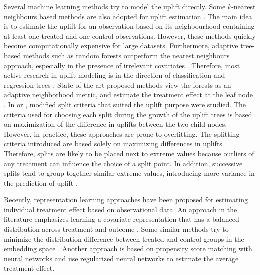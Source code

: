 \documentclass{article}
\begin{document}
Several machine learning methods try to model the uplift directly. Some $k$-nearest neighbours \citep{cover1967nearest} based methods are also adopted for uplift estimation \citep{crump2008nonparametric, Alemi.etal-PersonalizedMedicine-2009, su2012facilitating}. The main idea is to estimate the uplift for an observation based on its neighbourhood containing at least one treated and one control observations. However, these methods quickly become computationally expensive for large datasets. Furthermore, adaptive tree-based methods such as random forests outperform the nearest neighbours approach, especially in the presence of irrelevant covariates \citep{wager2018estimation}. Therefore, most active research in uplift modeling is in the direction of classification and regression trees \citep{breiman1984classification}. State-of-the-art proposed methods view the forests as an adaptive neighborhood metric, and estimate the treatment effect at the leaf node \citep{su2009subgroup, chipman2010bart, guelman2012random}. In \cite{radcliffe1999differential, radcliffe2011real} or \cite{ hansotia2002direct, hansotia2002incremental}, modified split criteria that suited the uplift purpose were studied. The criteria used for choosing each split during the growth of the uplift trees is based on maximization of the difference in uplifts between the two child nodes. However, in practice, these approaches are prone to overfitting. The splitting criteria introduced are based solely on maximizing differences in uplifts. Therefore, splits are likely to be placed next to extreme values because outliers of any treatment can influence the choice of a split point. In addition, successive splits tend to group together similar extreme values, introducing more variance in the prediction of uplift \citep{zhao2017practically}.

Recently, representation learning approaches have been proposed for estimating individual treatment effect based on observational data. An approach in the literature emphasizes learning a covariate representation that has a balanced distribution across treatment and outcome \citep{johansson2016learning}. Some similar methods try to minimize the distribution difference between treated and control groups in the embedding space \citep{shalit2017estimating, yao2018representation}. Another approach is based on propensity score matching \citep{rosenbaum1983central} with neural networks \citep{alaa2017deep, schwab2018perfect} and \citep{shi2019adapting} use regularized neural networks to estimate the average treatment effect.
\end{document}
